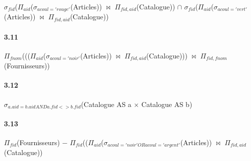 \documentclass[a4paper,10pt]{article}
\begin{document}
$\sigma_{fid}$($\Pi_{aid}$($\sigma_{acoul='rouge'}$(Articles)) 
$\bowtie$
$\Pi_{fid,aid}$(Catalogue))
$\cap$
$\sigma_{fid}$($\Pi_{aid}$($\sigma_{acoul='vert'}$(Articles)) 
$\bowtie$
$\Pi_{fid,aid}$(Catalogue))

\paragraph{3.11}

$\Pi_{fnom}$((($\Pi_{aid}$($\sigma_{acoul='noir'}$(Articles))
$\bowtie$
$\Pi_{fid,aid}$(Catalogue)))
$\bowtie$
$\Pi_{fid, fnom}$(Fournisseurs))


\paragraph{3.12}

$\sigma_{a.aid=b.aid AND a.fid <> b.fid }$(Catalogue AS a $\times$ Catalogue AS b)


\paragraph{3.13}

$\Pi_{fid}$(Fournisseurs)
$-$
$\Pi_{fid}$(($\Pi_{aid}$($\sigma_{acoul='noir' OR acoul='argent'}$(Articles))
$\bowtie$
$\Pi_{fid, aid}$(Catalogue))
\end{document}
